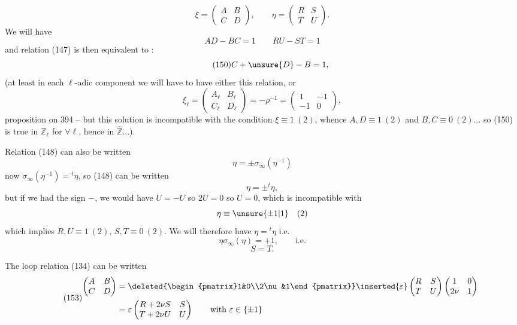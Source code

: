 \[
\tag{148}
\xi=\begin{pmatrix}A&B\\C&D\end{pmatrix},\qquad
\eta=\begin{pmatrix}R&S\\T&U\end{pmatrix}.
\]
We will have
\[
\tag{149}
AD-BC=1\qquad RU-ST=1
\]
and relation (147) is then equivalent to :
\[
\tag{150}
C+\unsure{D}-B=1,
\]
 (at least in each $\ell$-adic component we will have to have either this relation, or
\[
\xi_\ell=\begin{pmatrix}A_\ell&B_\ell\\C_\ell&D_\ell\end{pmatrix}
=-\rho^{-1}=\begin{pmatrix}1&-1\\-1&0\end{pmatrix},
\]
 proposition on  394 -- but this solution is incompatible with the condition $\boxed{\xi\equiv1\ (2)}$, whence $A,D\equiv1\ (2)$ and $B,C\equiv0\ (2)\ldots$ so (150) is true in $\mathbb Z_\ell$ for $\forall\ell$, hence in $\widehat{\mathbb Z}\ldots$).


Relation (148) can also be written
\[
\eta=\pm\sigma_\infty(\eta^{-1})
\]
now $\sigma_\infty(\eta^{-1})={}^t\eta$, so (148) can be written
\[
\eta=\pm{}^t\eta,
\]
but if we had the sign $-$, we would have $U=-U$ so $2U=0$ so $U=0$, which is incompatible with
\[
\eta\equiv\unsure{\pm1|1}\quad(2)
\]
which implies $R,U\equiv1\ (2)$, $S,T\equiv0\ (2)$. We will therefore have $\eta={}^t\eta$ i.e.
\[
\tag{151}
\eta\sigma_\infty(\eta)=+1,\qquad\text{i.e.}
\]
\[
\tag{152}
S=T.
\]

The loop relation (134) can be written
\[
\tag{153}
\begin{aligned}
\begin{pmatrix}A&B\\C&D\end{pmatrix}
&=\deleted{\begin{pmatrix}1&0\\2\nu&1\end{pmatrix}}
\inserted{\varepsilon}\begin{pmatrix}R&S\\T&U\end{pmatrix}
\begin{pmatrix}1&0\\2\nu&1\end{pmatrix}\\
&=\varepsilon\begin{pmatrix}R+2\nu S&S\\T+2\nu U&U\end{pmatrix}
\qquad\text{with }\varepsilon\in\{\pm1\}
\end{aligned}
\]

